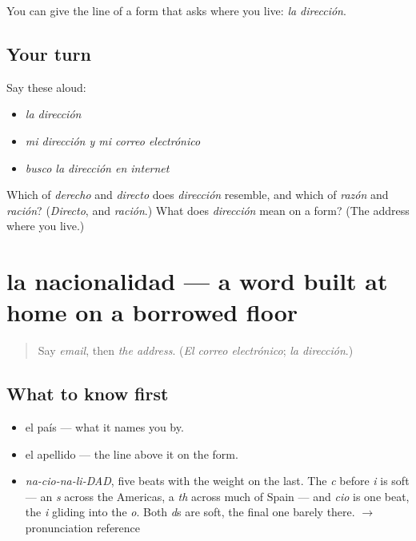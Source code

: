 \begin{grammarlens}[title={What you've built}]
You can give the line of a form that asks where you live: \emph{la dirección}.
\end{grammarlens}

\subsection*{Your turn}
Say these aloud:

\begin{itemize}
\raggedright
  \item \emph{la dirección}
  \item \emph{mi dirección y mi correo electrónico}
  \item \emph{busco la dirección en internet}
\end{itemize}

\begin{tcolorbox}[breakable,colback=teal!4,colframe=teal!35!black,title={Before you move on}]
Which of \emph{derecho} and \emph{directo} does \emph{dirección} resemble, and which of \emph{razón} and \emph{ración}? (\emph{Directo}, and \emph{ración}.) What does \emph{dirección} mean on a form? (The address where you live.)
\end{tcolorbox}
\section[la nacionalidad]{la nacionalidad — a word built at home on a borrowed floor}

\label{lesson:ES-C393-nacionalidad}



\begin{quote}
Say \emph{email}, then \emph{the address}. (\emph{El correo electrónico}; \emph{la dirección}.)
\end{quote}

\subsection*{What to know first}
\begin{itemize}
\raggedright
  \item el país — what it names you by.
  \item el apellido — the line above it on the form.
\end{itemize}

\begin{sounds}
\begin{itemize}
\raggedright
  \item \emph{na-cio-na-li-DAD}, five beats with the weight on the last. The \emph{c} before \emph{i} is soft — an \emph{s} across the Americas, a \emph{th} across much of Spain — and \emph{cio} is one beat, the \emph{i} gliding into the \emph{o}. Both \emph{d}s are soft, the final one barely there. $\to$ pronunciation reference
\end{itemize}
\end{sounds}

